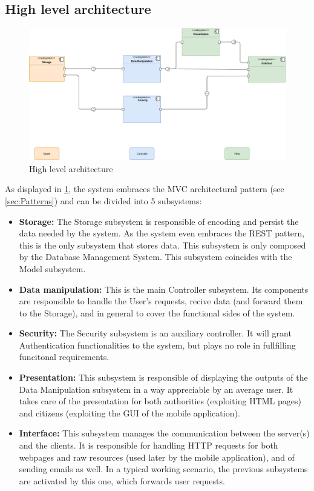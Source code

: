 \documentclass{article}
\begin{document}
	\subsection{High level architecture}
		\begin{figure}[h]
			\includegraphics[width=\linewidth]{images/High_level_architecture.png}
			\caption{High level architecture}
			\label{fig:HighLevelArchitecture}
		\end{figure}
		As displayed in \cref{fig:HighLevelArchitecture}, the system embraces the MVC architectural pattern (see \cref{sec:Patterns}) and can be divided into 5 subsystems:
		\begin{itemize}
			\item \textbf{Storage:} 
				The Storage subsystem is responsible of encoding and persist the data needed by the system. 
				As the system even embraces the REST pattern, this is the only subsystem that stores data. 
				This subsystem is only composed by the Database Management System. This subsystem coincides with the Model subsystem.
			\item \textbf{Data manipulation:} 
				This is the main Controller subsystem. 
				Its components are responsible to handle the User's requests, recive data (and forward them to the Storage), and in general to cover the functional 
				sides of the system.
			\item \textbf{Security:} 
				The Security subsystem is an auxiliary controller. It will grant Authentication functionalities to the system, but plays no role in fullfilling
				funcitonal requirements.
			\item \textbf{Presentation:}
				This subsystem is responsible of displaying the outputs of the Data Manipulation subsystem in a way appreciable by an average user. 
				It takes care of the presentation for both authorities (exploiting HTML pages) and citizens (exploiting the GUI of the mobile application).
			\item \textbf{Interface:}
				This subsystem manages the communication between the server(s) and the clients. It is responsible for handling HTTP requests for both webpages and
				raw resources (used later by the mobile application), and of sending emails as well. In a typical working scenario, the previous subsystems are
				activated by this one, which forwards user requests.
		\end{itemize}
		\FloatBarrier
\end{document}
